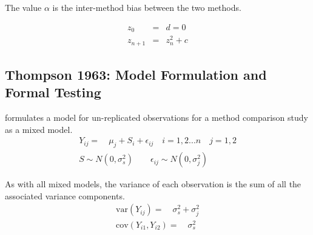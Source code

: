 \documentclass[12pt, a4paper]{report}
\theoremstyle{plain}
\theoremstyle{definition}
\theoremstyle{remark}
\begin{document}
The value $\alpha$ is the inter-method bias between the two
methods.

\begin{eqnarray}
z_0 &=& d = 0 \\
z_{n+1} &=& z_n^2+c
\end{eqnarray}

	\subsection{Thompson 1963: Model Formulation and Formal Testing}
	
	
	
	
	\citet{Kinsella} formulates a model for un-replicated observations
	for a method comparison study as a mixed model.
	\begin{eqnarray}
	Y_{ij} =\quad \mu_{j} + S_{i} + \epsilon_{ij} \quad i=1,2...n\quad
	j=1,2\\
	S \sim N(0,\sigma^{2}_{s})\qquad \epsilon_{ij} \sim
	N(0,\sigma^{2}_{j}) \nonumber
	\end{eqnarray}
	
	As with all mixed models, the variance of each observation is the
	sum of all the associated variance components.
	\begin{eqnarray}
	\textrm{var}(Y_{ij}) =\quad \sigma^{2}_{s} + \sigma^{2}_{j} \\
	\textrm{cov}(Y_{i1},Y_{i2})=\quad \sigma^{2}_{s} \nonumber
	\end{eqnarray}
	
\end{document}
